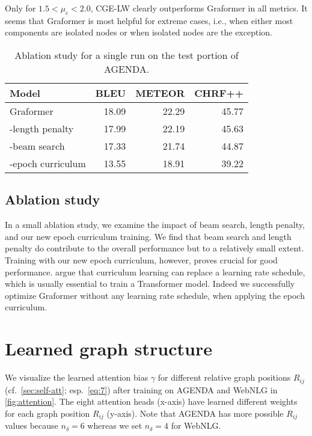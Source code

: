 \documentclass[11pt]{article}
\begin{document}
Only for $1.5 < \mu_c < 2.0$,
CGE-LW clearly outperforms Graformer in all metrics.
It seems that Graformer is most helpful for extreme cases, i.e.,
when either most components are isolated nodes or when isolated nodes are the exception.
 

\begin{table}[t]
	\centering
	\small
	\begin{tabular}{lrrr}
		\toprule
		Model & BLEU & METEOR & CHRF++ \\
		\midrule
		Graformer & 18.09 & 22.29 & 45.77 \\
		\midrule
		-length penalty & 17.99 & 22.19 & 45.63 \\
		-beam search & 17.33 & 21.74 & 44.87 \\
		-epoch curriculum & 13.55 & 18.91 & 39.22 \\
		\bottomrule
	\end{tabular}
	\caption{Ablation study for a single run on the test portion of AGENDA.}
	\label{tab:ablation}
\end{table}

\subsection{Ablation study}

In a small ablation study, we examine the impact of beam search, length penalty,
and our new epoch curriculum training.
We find that beam search and length penalty do contribute to the overall performance but
to a relatively small extent.
Training with our new epoch curriculum, however,
proves crucial for good performance.
\citet{platanios-etal-2019-competence} argue that curriculum learning can replace a learning rate schedule,
which is usually essential to train a Transformer model.
Indeed we successfully optimize Graformer without any learning rate schedule, when applying the epoch curriculum.


\section{Learned graph structure}
\label{sec:learned_structure}

We visualize the learned attention bias $\gamma$
for different relative graph positions $R_{ij}$ (cf.\ \cref{sec:self-att}; esp.\ \cref{eq:7})
after training on AGENDA and WebNLG
in \cref{fig:attention}.
The eight attention heads (x-axis)
have learned
different weights for each graph position $R_{ij}$ (y-axis).
Note that AGENDA has more possible $R_{ij}$ values
because $n_\delta = 6$ whereas we set $n_\delta=4$ for WebNLG.
\end{document}

